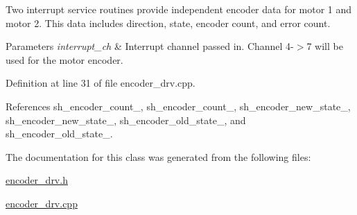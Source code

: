Two interrupt service routines provide independent encoder data for motor 1 and motor 2. This data includes direction, state, encoder count, and error count. 
\begin{DoxyParams}{Parameters}
{\em interrupt\-\_\-ch} & Interrupt channel passed in. Channel 4-\/$>$7 will be used for the motor encoder. \\
\hline
\end{DoxyParams}


Definition at line 31 of file encoder\-\_\-drv.\-cpp.



References sh\-\_\-encoder\-\_\-count\-\_, sh\-\_\-encoder\-\_\-count\-\_, sh\-\_\-encoder\-\_\-new\-\_\-state\-\_, sh\-\_\-encoder\-\_\-new\-\_\-state\-\_, sh\-\_\-encoder\-\_\-old\-\_\-state\-\_, and sh\-\_\-encoder\-\_\-old\-\_\-state\-\_.



The documentation for this class was generated from the following files\-:\begin{DoxyCompactItemize}
\item 
\hyperlink{encoder__drv_8h}{encoder\-\_\-drv.\-h}\item 
\hyperlink{encoder__drv_8cpp}{encoder\-\_\-drv.\-cpp}\end{DoxyCompactItemize}

